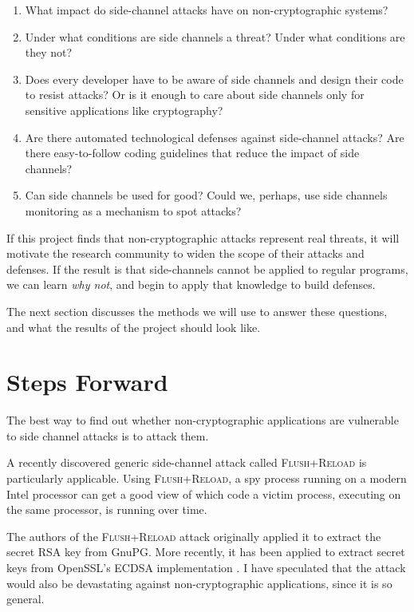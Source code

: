 \documentclass{acm_proc_article-sp}
\begin{document}
\begin{enumerate}
\item What impact do side-channel attacks have on non-cryptographic systems?

\item Under what conditions are side channels a threat? Under what conditions
      are they not?

\item Does every developer have to be aware of side channels and design their
      code to resist attacks? Or is it enough to care about side channels only
      for sensitive applications like cryptography?

\item Are there automated technological defenses against side-channel attacks?
      Are there easy-to-follow coding guidelines that reduce the impact of side
      channels?

\item Can side channels be used for good? Could we, perhaps, use side channels
      monitoring as a mechanism to spot attacks?
\end{enumerate}

If this project finds that non-cryptographic attacks represent real threats, it
will motivate the research community to widen the scope of their attacks and
defenses. If the result is that side-channels cannot be applied to regular
programs, we can learn \emph{why not}, and begin to apply that knowledge to
build defenses.

The next section discusses the methods we will use to answer these questions,
and what the results of the project should look like.

\section{Steps Forward}
\label{sec:stepsforward}

The best way to find out whether non-cryptographic applications are vulnerable
to side channel attacks is to attack them.

A recently discovered generic side-channel attack called \textsc{Flush+Reload}
\cite{yarom2013flush} is particularly applicable. Using \textsc{Flush+Reload},
a spy process running on a modern Intel processor can get a good view of which
code a victim process, executing on the same processor, is running over time.

The authors of the \textsc{Flush+Reload} attack originally applied it to extract
the secret RSA key from GnuPG. More recently, it has been applied to extract
secret keys from OpenSSL's ECDSA implementation \cite{yarom2014recovering}.
I have speculated \cite{hornby2013flush} that the attack would also be
devastating against non-cryptographic applications, since it is so general.
\end{document}

